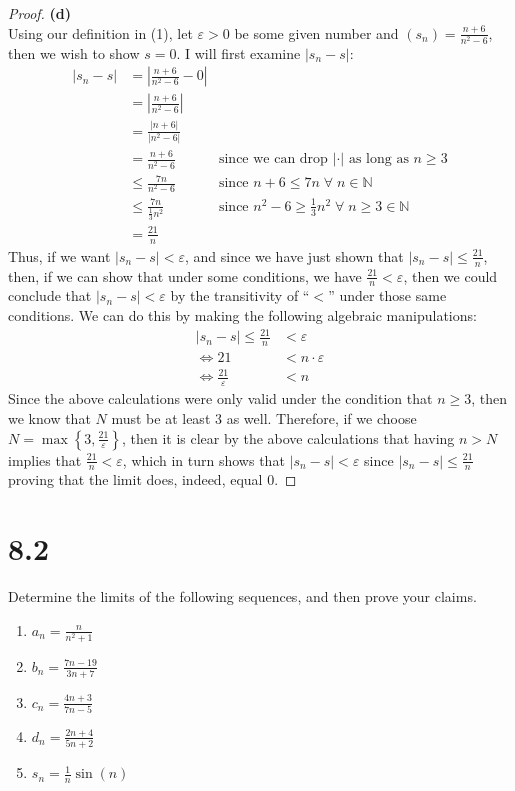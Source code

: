 \documentclass[10pt,a4paper]{article}
\theoremstyle{definition}
\begin{document}
\begin{proof}{\textbf{(d)}}
\\Using our definition in (1), let $\varepsilon > 0$ be some given number and $\displaystyle (s_n) = \frac{n + 6}{n^2 - 6}$, then we wish to show $s = 0$. I will first examine $|s_n - s|$:
\begin{align*}
|s_n - s| &= \left|\frac{n + 6}{n^2 - 6} - 0\right|\\
&= \left| \frac{n + 6}{n^2 - 6} \right|\\
&= \frac{|n + 6|}{|n^2 - 6|}\\
&= \frac{n + 6}{n ^2 - 6} &\text{since we can drop } |\cdot| \text{ as long as } n \geq 3\\
&\leq \frac{7n}{n^2 - 6} &\text{since } n + 6 \leq 7n \; \forall \; n \in \mathbb{N}\\
&\leq \frac{7n}{\frac{1}{3}n^2} &\text{since } n^2 - 6 \geq \frac{1}{3}n^2 \; \forall \; n \geq 3 \in \mathbb{N}\\
&= \frac{21}{n}
\end{align*}
Thus, if we want $|s_n - s| < \varepsilon$,  and since we have just shown that $|s_n - s| \leq \frac{21}{n}$, then, if we can show that under some conditions, we have $\frac{21}{n} < \varepsilon$, then we could conclude that $|s_n - s| < \varepsilon$ by the transitivity of \enquote{$<$} under those same conditions. We can do this by making the following algebraic manipulations:
\begin{align*}
|s_n - s| \leq \frac{21}{n} &< \varepsilon\\
\iff 21 &< n\cdot \varepsilon\\
\iff \frac{21}{\varepsilon} &< n
\end{align*}
Since the above calculations were only valid under the condition that $n \geq 3$, then we know that $N$ must be at least 3 as well. Therefore, if we choose $\displaystyle N = \max\left\{3, \frac{21}{\varepsilon}\right\}$, then it is clear by the above calculations that having $n > N$ implies that $\displaystyle \frac{21}{n} < \varepsilon$, which in turn shows that $|s_n - s| < \varepsilon$ since $\displaystyle |s_n - s| \leq \frac{21}{n}$ proving that the limit does, indeed, equal $\displaystyle 0$.
\end{proof}

\section*{8.2}
Determine the limits of the following sequences, and then prove your claims.
\begin{enumerate}[label = (\alph*)]
\item $\displaystyle a_n = \frac{n}{n^2 + 1}$
\item $\displaystyle b_n = \frac{7n - 19}{3n + 7}$
\item $\displaystyle c_n = \frac{4n + 3}{7n - 5}$
\item $\displaystyle d_n = \frac{2n + 4}{5n + 2}$
\item $\displaystyle s_n = \frac{1}{n}\sin(n)$
\end{enumerate}
\end{document}
